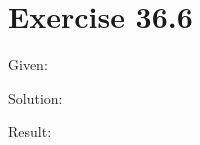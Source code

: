 \documentclass[a4paper, 10pt]{scrartcl}
\begin{document}
\section{Exercise 36.6}

Given:

Solution:

Result:
\end{document}
